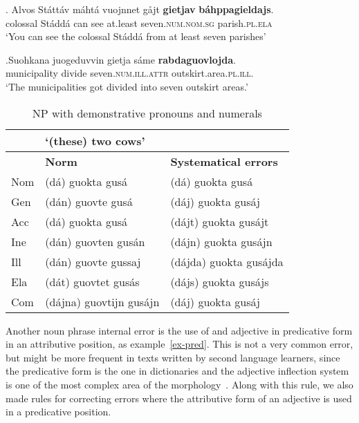 \documentclass[free]{flammie}
\begin{document}
\exg. Alvos Státtáv máhtá vuojnnet gåjt \textbf{gietjav}
\textbf{báhppagieldajs}.\label{ex-num}\\
colossal Stáddá can see at.least seven\textsc{.num.nom.sg}
parish\textsc{.pl.ela}\\
`You can see the colossal Stáddá from at least seven parishes'

\exg.Suohkana juogeduvvin gietja sáme \textbf{rabdaguovlojda}.\label{ex-num2}\\
municipality divide seven\textsc{.num.ill.attr}  outskirt.area\textsc{.pl.ill.}
\\
`The municipalities got divided into seven  outskirt areas.'


\begin{table}[h]
    \centering
    \begin{small}
    \begin{tabular}{lll}
         \toprule
         \textit & \textbf{`(these) two cows'}\\
         \midrule
         \textit & \textbf{Norm} & \textbf{Systematical errors}\\
         \midrule
 Nom & (dá) guokta gusá & (dá) guokta gusá \\
 Gen & (dán) guovte gusá & (dáj) guokta gusáj  \\
 Acc & (dá) guokta gusá & (dájt) guokta gusájt  \\
 Ine & (dán) guovten gusán & (dájn) guokta gusájn  \\
 Ill & (dán) guovte gussaj & (dájda) guokta gusájda \\
 Ela & (dát) guovtet gusás & (dájs) guokta gusájs \\
 Com & (dájna) guovtijn gusájn & (dáj) guokta gusáj   \\
 \bottomrule
         \end{tabular}
         \end{small}
    \caption{NP with demonstrative pronouns and numerals\label{Numerals}}
\end{table}


Another noun phrase internal error is the use of and adjective in predicative
form in an attributive position, as example~\ref{ex-pred}. This is not a very
common error, but might be more frequent in texts written by second language
learners, since the predicative form is the one in dictionaries and the
adjective inflection system is one of the most complex area of the
morphology~\cite{ylikoski2022lule}. Along with this rule, we also made rules for
correcting errors where the attributive form of an adjective is used in a
predicative position.
\end{document}
